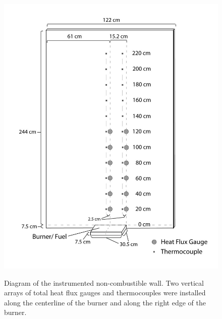 \documentclass[twoside]{uocthesis}
\begin{document}
{\begin{figure}
	\centering
	\includegraphics[width=\textwidth]{../Figures/Instrumented_NC_Wall}\\
	\caption[Diagram of the instrumented non-combustible wall]{Diagram of the instrumented non-combustible wall. Two vertical arrays of total heat flux gauges and thermocouples were installed along the centerline of the burner and along the right edge of the burner.}
	\label{Instrumented_NC_Wall}
\end{figure}

}
\end{document}
